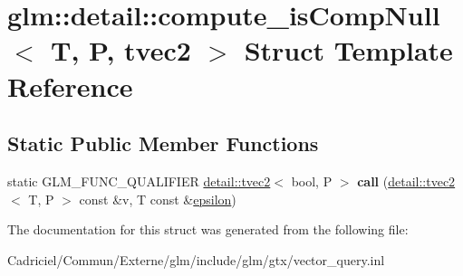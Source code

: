 \hypertarget{structglm_1_1detail_1_1compute__is_comp_null_3_01_t_00_01_p_00_01tvec2_01_4}{}\section{glm\+:\+:detail\+:\+:compute\+\_\+is\+Comp\+Null$<$ T, P, tvec2 $>$ Struct Template Reference}
\label{structglm_1_1detail_1_1compute__is_comp_null_3_01_t_00_01_p_00_01tvec2_01_4}
\subsection*{Static Public Member Functions}
\begin{DoxyCompactItemize}
\item 
static G\+L\+M\+\_\+\+F\+U\+N\+C\+\_\+\+Q\+U\+A\+L\+I\+F\+I\+ER \hyperlink{structglm_1_1detail_1_1tvec2}{detail\+::tvec2}$<$ bool, P $>$ {\bfseries call} (\hyperlink{structglm_1_1detail_1_1tvec2}{detail\+::tvec2}$<$ T, P $>$ const \&v, T const \&\hyperlink{group__gtc__constants_gacb41049b8d22c8aa90e362b96c524feb}{epsilon})\hypertarget{structglm_1_1detail_1_1compute__is_comp_null_3_01_t_00_01_p_00_01tvec2_01_4_abf9b6241b4469888505eb8d3a5f5afb5}{}\label{structglm_1_1detail_1_1compute__is_comp_null_3_01_t_00_01_p_00_01tvec2_01_4_abf9b6241b4469888505eb8d3a5f5afb5}

\end{DoxyCompactItemize}


The documentation for this struct was generated from the following file\+:\begin{DoxyCompactItemize}
\item 
Cadriciel/\+Commun/\+Externe/glm/include/glm/gtx/vector\+\_\+query.\+inl\end{DoxyCompactItemize}
